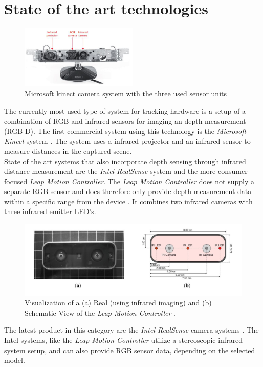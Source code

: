 \section{State of the art technologies}
\label{sec:state_of_the_art}
\begin{figure}
\label{img:kinect}
\includegraphics[width=0.5\textwidth]{images/kinnect.JPG} 
\caption{Microsoft kinect camera system with the three used sensor units \cite{Zhang.2012}}
\end{figure}
The currently most used type of system for tracking hardware is a setup of a combination of RGB and infrared sensors for imaging an depth measurement (RGB-D). The first commercial system using this technology is the \textit{ Microsoft Kinect} system \cite{Zhang.2012}. The system uses a infrared projector and an infrared sensor to measure distances in the captured scene.\\
State of the art systems that also incorporate depth sensing through infrared distance measurement are the \textit{Intel RealSense} system and the more consumer focused \textit{Leap Motion Controller}. The\textit{ Leap Motion Controller} does not supply a separate RGB sensor and does therefore only provide depth measurement data within a specific range from the device \cite{Weichert.2013}. It combines two infrared cameras with three infrared emitter LED's.
\begin{figure}[H]
\includegraphics[width=\textwidth]{images/leapMotion.JPG}
\caption{Visualization of a (a) Real (using infrared imaging) and (b) Schematic View of the \textit{Leap Motion Controller} \cite{Weichert.2013}.}
\label{img:leapMotion} 
\end{figure}
The latest product in this category are the \textit{Intel RealSense} camera systems \cite{IntelCorporation.2018}. The Intel systems, like the\textit{ Leap Motion Controller} utilize a stereoscopic infrared system setup, and can also provide RGB sensor data, depending on the selected model.
